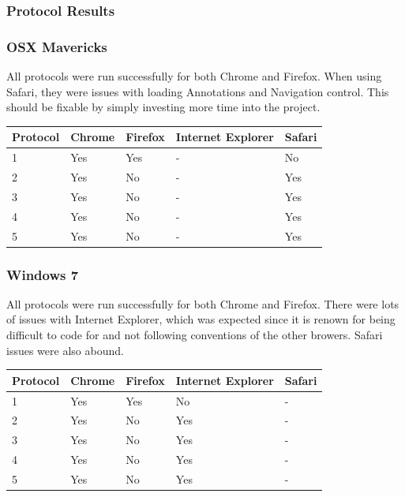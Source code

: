 \documentclass[a4paper,11pt,titlepage]{article}
\begin{document}
\subsubsection{Protocol Results}

\subsubsection*{OSX Mavericks}

All protocols were run successfully for both Chrome and Firefox. When using Safari, they were issues with loading Annotations and Navigation control. This should be fixable by simply investing more time into the project.\\


\begin{center}
  \begin{tabular}{ | l || l | l | l | l |}
    \hline
    Protocol & Chrome & Firefox & Internet Explorer & Safari \\ \hline \hline
    1 & Yes & Yes  & - & No   \\ \hline
    2 & Yes & No & - & Yes \\ \hline
    3 & Yes & No & - & Yes  \\ \hline
    4 & Yes & No & - & Yes  \\ \hline
    5 & Yes & No & - & Yes  \\
    \hline
  \end{tabular}
\end{center}

\subsubsection*{Windows 7}

All protocols were run successfully for both Chrome and Firefox. There were lots of issues with Internet Explorer, which was expected since it is renown for being difficult to code for and not following conventions of the other browers. Safari issues were also abound.

\begin{center}

  \begin{tabular}{ | l || l | l | l | l |}
    \hline
    Protocol & Chrome & Firefox & Internet Explorer & Safari \\ \hline \hline
    1 & Yes & Yes  & No  & - \\ \hline
    2 & Yes & No & Yes & - \\ \hline
    3 & Yes & No & Yes & - \\ \hline
    4 & Yes & No & Yes & - \\ \hline
    5 & Yes & No & Yes & - \\
    \hline
  \end{tabular}

\end{center}
\end{document}
